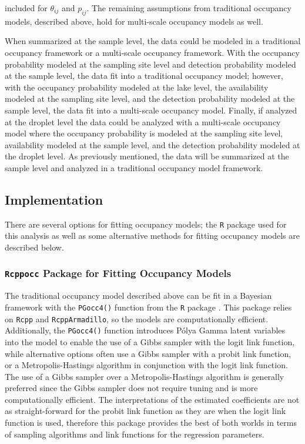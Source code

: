 \documentclass[12pt]{article}\usepackage[]{graphicx}\usepackage[]{color}
\begin{document}
included for $\theta_{ij}$ and $p_{ij}$. The remaining assumptions from traditional occupancy models, described above, hold for multi-scale occupancy models as well.  

When summarized at the sample level, the data could be modeled in a traditional occupancy framework or a multi-scale occupancy framework. With the occupancy probability modeled at the sampling site level and detection probability modeled at the sample level, the data fit into a traditional occupancy model; however, with the occupancy probability modeled at the lake level, the availability modeled at the sampling site level, and the detection probability modeled at the sample level, the data fit into a multi-scale occupancy model. Finally, if analyzed at the droplet level the data could be analyzed with a multi-scale occupancy model where the occupancy probability is modeled at the sampling site level, availability modeled at the sample level, and the detection probability modeled at the droplet level. As previously mentioned, the data will be summarized at the sample level and analyzed in a traditional occupancy model framework. 

\subsection{Implementation}

There are several options for fitting occupancy models; the \texttt{R} package used for this analysis as well as some alternative methods for fitting occupancy models are described below. 

\subsubsection{\texttt{Rcppocc} Package for Fitting Occupancy Models}

The traditional occupancy model described above can be fit in a Bayesian framework with the \texttt{PGocc4()} function from the \texttt{R} package  \cite{Rcppocc}. This package relies on \texttt{Rcpp} and \texttt{RcppArmadillo}, so the models are computationally efficient. Additionally, the \texttt{PGocc4()} function introduces P\'{o}lya Gamma latent variables into the model to enable the use of a Gibbs sampler with the logit link function, while alternative options often use a Gibbs sampler with a probit link function, or a Metropolis-Hastings algorithm in conjunction with the logit link function. The use of a Gibbs sampler over a Metropolis-Hastings algorithm is generally preferred since the Gibbs sampler does not require tuning and is more computationally efficient. The interpretations of the estimated coefficients are not as straight-forward for the probit link function as they are when the logit link function is used, therefore this package provides the best of both worlds in terms of sampling algorithms and link functions for the regression parameters.  
\end{document}
